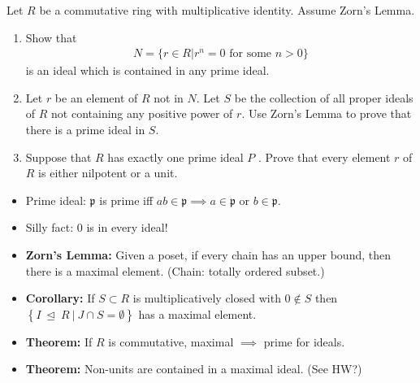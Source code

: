 Let \(R\) be a commutative ring with multiplicative identity. Assume
Zorn's Lemma.

\begin{enumerate}
\def\labelenumi{\alph{enumi}.}
\item
  Show that
  \begin{align*}
  N = \{r \in R \mathrel{\Big|}r^n = 0 \text{ for some } n > 0\}
  \end{align*}
  is an ideal which is contained in any prime ideal.
\item
  Let \(r\) be an element of \(R\) not in \(N\). Let \(S\) be the
  collection of all proper ideals of \(R\) not containing any positive
  power of \(r\). Use Zorn's Lemma to prove that there is a prime ideal
  in \(S\).
\item
  Suppose that \(R\) has exactly one prime ideal \(P\) . Prove that
  every element \(r\) of \(R\) is either nilpotent or a unit.
\end{enumerate}

\begin{concept}

\envlist

\begin{itemize}
\item
  Prime ideal: \(\mathfrak{p}\) is prime iff
  \(ab \in \mathfrak{p} \implies a\in \mathfrak{p}\) or
  \(b\in \mathfrak{p}\).
\item
  Silly fact: 0 is in every ideal!
\item
  \textbf{Zorn's Lemma:} Given a poset, if every chain has an upper
  bound, then there is a maximal element. (Chain: totally ordered
  subset.)
\item
  \textbf{Corollary:} If \(S\subset R\) is multiplicatively closed with
  \(0\not\in S\) then
  \(\left\{{I {~\trianglelefteq~}R {~\mathrel{\Big|}~}J\cap S = \emptyset}\right\}\)
  has a maximal element.

\item
  \textbf{Theorem:} If \(R\) is commutative, maximal \(\implies\) prime
  for ideals.

\item
  \textbf{Theorem:} Non-units are contained in a maximal ideal. (See
  HW?)
\end{itemize}

\end{concept}

